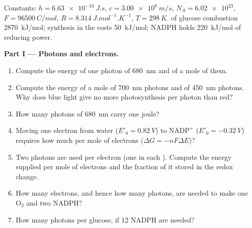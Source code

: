 \begin{problem}
\label{pb:b1:photosynthesis:1}
Constants: $h = \qty{6.63e-34}{J.s}$, $c = \qty{3.00e8}{m/s}$,
$N_A = \num{6.02e23}$, $F = \qty{96500}{C/mol}$, $R = \qty{8.314}{J.mol^{-1}.K^{-1}}$,
$T = \qty{298}{K}$.  of glucose combustion
\qty{2870}{kJ/mol};  synthesis in the  costs
\qty{50}{kJ/mol}; NADPH holds \qty{220}{kJ/mol} of reducing power.

\medskip
\noindent\textbf{Part I --- Photons and electrons.}
\begin{enumerate}
  \item Compute the energy of one photon of \qty{680}{nm} and of a
        mole of them.
  \item Compute the energy of a mole of \qty{700}{nm} photons and of
        \qty{450}{nm} photons. Why does blue light give no more
        photosynthesis per photon than red?
  \item How many photons of \qty{680}{nm} carry one joule?
  \item Moving one electron from water ($E'_0 = \qty{+0.82}{V}$) to
        $\mathrm{NADP^+}$ ($E'_0 = \qty{-0.32}{V}$) requires how much
         per mole of electrons ($\Delta G = -nF\Delta E$)?
  \item Two photons are used per electron (one in each ).
        Compute the energy supplied per mole of electrons and the
        fraction of it stored in the redox change.
  \item How many electrons, and hence how many photons, are needed to
        make one $\mathrm{O_2}$ and two NADPH?
  \item How many photons per glucose, if 12 NADPH are needed?
\end{enumerate}


\end{problem}
